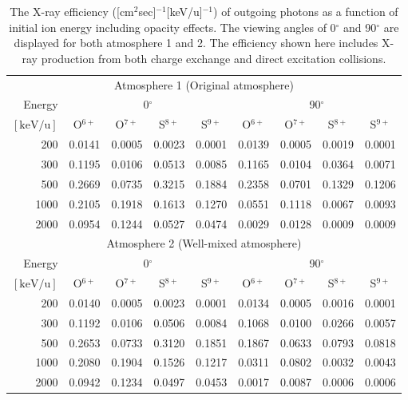 \documentclass[draft]{agujournal2018}
\begin{document}
\begin{table}[ht]
    \centering
    \begin{tabular}{r|c|c|c|c|c|c|c|c}
    \multicolumn{9}{c}{Atmosphere 1 (Original atmosphere)} \\ \cline{2-9}
    Energy  & \multicolumn{4}{c|}{0$^\circ$} & \multicolumn{4}{c}{90$^\circ$} \\ \cline{2-9}
    $\mathrm{[keV/u]}$ & O$^{6+}$ & O$^{7+}$ & S$^{8+}$ & S$^{9+}$ & O$^{6+}$ & O$^{7+}$ & S$^{8+}$ & S$^{9+}$ \\ \cline{1-9}
    200      & 0.0141 & 0.0005 & 0.0023 & 0.0001 & 0.0139 & 0.0005 & 0.0019 & 0.0001 \\
    300      & 0.1195 & 0.0106 & 0.0513 & 0.0085 & 0.1165 & 0.0104 & 0.0364 & 0.0071 \\
    500      & 0.2669 & 0.0735 & 0.3215 & 0.1884 & 0.2358 & 0.0701 & 0.1329 & 0.1206 \\
    1000     & 0.2105 & 0.1918 & 0.1613 & 0.1270 & 0.0551 & 0.1118 & 0.0067 & 0.0093 \\
    2000     & 0.0954 & 0.1244 & 0.0527 & 0.0474 & 0.0029 & 0.0128 & 0.0009 & 0.0009 \\
    \hline
    \multicolumn{9}{c}{Atmosphere 2 (Well-mixed atmosphere)} \\ \cline{2-9}
    Energy  & \multicolumn{4}{c|}{0$^\circ$} & \multicolumn{4}{c}{90$^\circ$} \\ \cline{2-9}
    $\mathrm{[keV/u]}$ & O$^{6+}$ & O$^{7+}$ & S$^{8+}$ & S$^{9+}$ & O$^{6+}$ & O$^{7+}$ & S$^{8+}$ & S$^{9+}$ \\ \cline{1-9}
    200      & 0.0140 & 0.0005 & 0.0023 & 0.0001 & 0.0134 & 0.0005 & 0.0016 & 0.0001 \\
    300      & 0.1192 & 0.0106 & 0.0506 & 0.0084 & 0.1068 & 0.0100 & 0.0266 & 0.0057 \\
    500      & 0.2653 & 0.0733 & 0.3120 & 0.1851 & 0.1867 & 0.0633 & 0.0793 & 0.0818 \\
    1000     & 0.2080 & 0.1904 & 0.1526 & 0.1217 & 0.0311 & 0.0802 & 0.0032 & 0.0043 \\
    2000     & 0.0942 & 0.1234 & 0.0497 & 0.0453 & 0.0017 & 0.0087 & 0.0006 & 0.0006 \\
    \hline
    \end{tabular}
    \caption{The X-ray efficiency ([cm$^2$sec]$^{-1}$[keV/u]$^{-1}$) of outgoing photons as a function of initial ion energy including opacity effects. The viewing angles of 0$^\circ$ and 90$^\circ$ are displayed for both atmosphere 1 and 2. The efficiency shown here includes X-ray production from both charge exchange and direct excitation collisions.}
    \label{tab:XrayEff}
\end{table}
\end{document}
